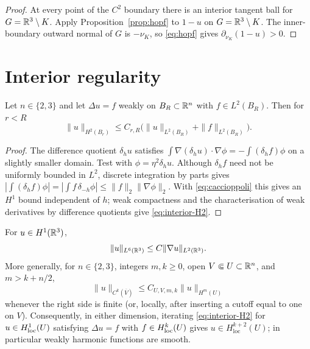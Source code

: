 \begin{proof}
At every point of the $C^2$ boundary there is an interior tangent ball for
$G=\mathbb R^3\setminus K$.  Apply Proposition~\ref{prop:hopf} to $1-u$ on
$G=\mathbb R^3\setminus K$.  The inner-boundary outward normal of $G$ is
$-\nu_K$, so \eqref{eq:hopf} gives
$\partial_{\nu_K}(1-u)>0$.
\end{proof}

\section{Interior regularity}

\begin{lemma}\label{lem:interior-H2}
Let $n\in\{2,3\}$ and let $\Delta u=f$ weakly on $B_R\subset\mathbb R^n$ with
$f\in L^2(B_R)$.  Then for $r<R$
\begin{equation}\label{eq:interior-H2}
  \|u\|_{H^2(B_r)}\le C_{r,R}\bigl(\|u\|_{L^2(B_R)}+\|f\|_{L^2(B_R)}\bigr).
\end{equation}
\end{lemma}

\begin{proof}
The difference quotient $\delta_hu$ satisfies
$\int\nabla(\delta_hu)\cdot\nabla\phi=-\int(\delta_hf)\phi$ on a slightly
smaller domain.  Test with $\phi=\eta^2\delta_hu$.  Although $\delta_hf$ need
not be uniformly bounded in $L^2$, discrete integration by parts gives
$|\int(\delta_hf)\phi|=|\int f\,\delta_{-h}\phi|\le\|f\|_2\|\nabla\phi\|_2$.
With \eqref{eq:caccioppoli} this gives an $H^1$ bound independent of $h$;
weak compactness and the characterisation of weak derivatives by difference
quotients give \eqref{eq:interior-H2}.
\end{proof}

\begin{lemma}\label{lem:sobolev-Ck}
For $u\in H^1(\mathbb R^3)$,
\begin{equation}\label{eq:H1-L6}
 \|u\|_{L^6(\mathbb R^3)}\le C\|\nabla u\|_{L^2(\mathbb R^3)}.
\end{equation}
More generally, for $n\in\{2,3\}$, integers $m,k\ge0$, open
$V\Subset U\subset\mathbb R^n$, and $m>k+n/2$,
\begin{equation}\label{eq:sobolev-Hm-Ck}
 \|u\|_{C^k(\overline V)}\le C_{U,V,m,k}\|u\|_{H^m(U)}
\end{equation}
whenever the right side is finite (or, locally, after inserting a cutoff
equal to one on $V$).
Consequently, in either dimension, iterating \eqref{eq:interior-H2} for
$u\in H^1_{\rm loc}(U)$ satisfying $\Delta u=f$ with
$f\in H^k_{\rm loc}(U)$ gives $u\in H^{k+2}_{\mathrm{loc}}(U)$; in
particular weakly harmonic functions are smooth.
\end{lemma}

